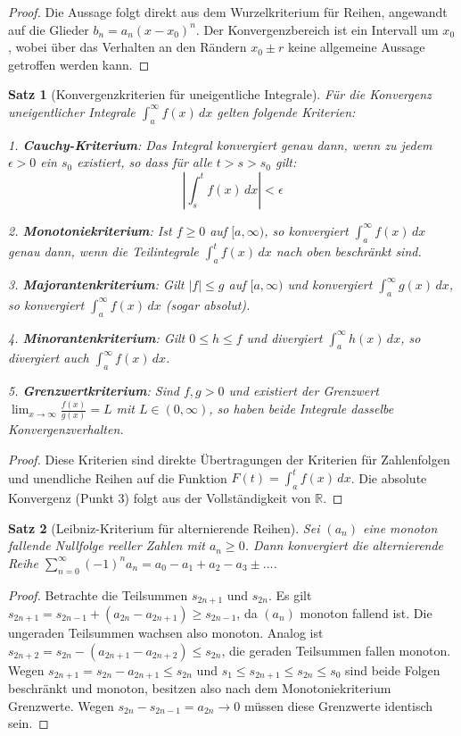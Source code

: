 \documentclass{article}
\newtheorem{satz}{Satz}[section]
\theoremstyle{definition}
\begin{document}
\begin{proof}
Die Aussage folgt direkt aus dem Wurzelkriterium für Reihen, angewandt auf die Glieder $b_n = a_n(x-x_0)^n$. Der Konvergenzbereich ist ein Intervall um $x_0$, wobei über das Verhalten an den Rändern $x_0 \pm r$ keine allgemeine Aussage getroffen werden kann.
\end{proof}
\begin{satz}[Konvergenzkriterien für uneigentliche Integrale]
Für die Konvergenz uneigentlicher Integrale $\int_{a}^{\infty} f(x) \, dx$ gelten folgende Kriterien:

1. \textbf{Cauchy-Kriterium}: Das Integral konvergiert genau dann, wenn zu jedem $\epsilon > 0$ ein $s_0$ existiert, so dass für alle $t > s > s_0$ gilt:
   $$\left| \int_{s}^{t} f(x) \, dx \right| < \epsilon$$

2. \textbf{Monotoniekriterium}: Ist $f \ge 0$ auf $[a, \infty)$, so konvergiert $\int_{a}^{\infty} f(x) \, dx$ genau dann, wenn die Teilintegrale $\int_{a}^{t} f(x) \, dx$ nach oben beschränkt sind.

3. \textbf{Majorantenkriterium}: Gilt $|f| \le g$ auf $[a, \infty)$ und konvergiert $\int_{a}^{\infty} g(x) \, dx$, so konvergiert $\int_{a}^{\infty} f(x) \, dx$ (sogar absolut).

4. \textbf{Minorantenkriterium}: Gilt $0 \le h \le f$ und divergiert $\int_{a}^{\infty} h(x) \, dx$, so divergiert auch $\int_{a}^{\infty} f(x) \, dx$.

5. \textbf{Grenzwertkriterium}: Sind $f, g > 0$ und existiert der Grenzwert $\lim_{x \to \infty} \frac{f(x)}{g(x)} = L$ mit $L \in (0, \infty)$, so haben beide Integrale dasselbe Konvergenzverhalten.


\end{satz}
\begin{proof}
Diese Kriterien sind direkte Übertragungen der Kriterien für Zahlenfolgen und unendliche Reihen auf die Funktion $F(t) = \int_{a}^{t} f(x) \, dx$. Die absolute Konvergenz (Punkt 3) folgt aus der Vollständigkeit von $\mathbb{R}$.
\end{proof}
\begin{satz}[Leibniz-Kriterium für alternierende Reihen]
Sei $(a_n)$ eine monoton fallende Nullfolge reeller Zahlen mit $a_n \ge 0$. Dann konvergiert die alternierende Reihe
$\sum_{n=0}^\infty (-1)^n a_n = a_0 - a_1 + a_2 - a_3 \pm \dots$.


\end{satz}
\begin{proof}
Betrachte die Teilsummen $s_{2n+1}$ und $s_{2n}$.
Es gilt $s_{2n+1} = s_{2n-1} + (a_{2n} - a_{2n+1}) \ge s_{2n-1}$, da $(a_n)$ monoton fallend ist. Die ungeraden Teilsummen wachsen also monoton.
Analog ist $s_{2n+2} = s_{2n} - (a_{2n+1} - a_{2n+2}) \le s_{2n}$, die geraden Teilsummen fallen monoton.
Wegen $s_{2n+1} = s_{2n} - a_{2n+1} \le s_{2n}$ und $s_1 \le s_{2n+1} \le s_{2n} \le s_0$ sind beide Folgen beschränkt und monoton, besitzen also nach dem Monotoniekriterium Grenzwerte. 
Wegen $s_{2n} - s_{2n-1} = a_{2n} \to 0$ müssen diese Grenzwerte identisch sein.
\end{proof}
\end{document}
